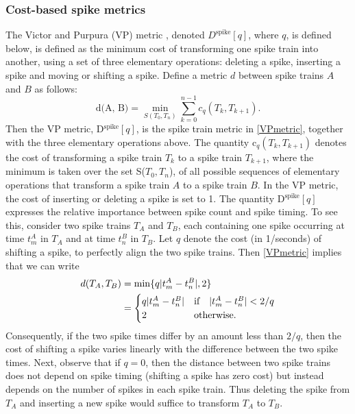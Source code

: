 \subsubsection{Cost-based spike metrics}
The Victor and Purpura (VP) metric \cite{Victor1996, Victor1998}, denoted
$D^{\text{spike}}[q]$, where $q$, is defined below, is defined as the minimum cost of transforming one spike train into another, using a set of three elementary operations:
deleting a spike, inserting a spike and moving or shifting a spike. Define a metric $d$ between spike trains $A$ and $B$ as follows:
\begin{equation}\label{VPmetric}
\text{d(A, B)} = \displaystyle \min_{S(T_{0}, T_{n})} \sum_{k=0}^{n-1} c_{q}(T_{k}, T_{k+1}). 
\end{equation} 
Then the VP metric, D$^{\text{spike}}[q]$, is the spike train metric in \eqref{VPmetric}, together with the three elementary operations above.
The quantity c$_{q}(T_{k}, T_{k+1})$ denotes the cost of transforming a spike train $T_{k}$ to a spike train $T_{k+1}$, where the minimum is taken over the set S($T_{0}, T_{n}$), of all possible sequences of elementary operations that transform a spike train $A$ to a spike train $B$.
In the VP metric, the cost of inserting or deleting a spike is set to 1.
The quantity D$^{\text{spike}}[q]$ expresses the relative importance between
spike count and spike timing.
To see this, consider two spike trains $T_{A}$ and $T_{B}$, each containing 
one spike occurring at time $t_{m}^{A}$ in $T_{A}$ and at time $t_{n}^{B}$ in $T_{B}$. Let $q$ denote the cost (in 1/seconds) of shifting a spike, to perfectly align the two spike trains.
Then \eqref{VPmetric} implies that we can write 
\begin{align*}
d(T_{A}, T_{B}) &= \displaystyle \min \{ q\lvert t_{m}^{A} - t_{n}^{B}\rvert,  2 \}\\
  &= \begin{cases} 
       q\lvert t_{m}^{A} - t_{n}^{B}\rvert & \text{if} \quad  \lvert t_{m}^{A} - t_{n}^{B}\rvert < 2/q \\
2 & \text{otherwise}.        
\end{cases}
\end{align*}
Consequently, if the two spike times differ by an amount less than $2/q$, then the cost of shifting a spike varies linearly with the difference between the two spike times.
Next, observe that if $q=0$, then the distance between two spike trains does not depend on spike timing (shifting a spike has zero cost) but instead depends on the number of spikes in each spike train. Thus deleting the spike from $T_{A}$ and inserting a new spike would suffice to transform $T_{A}$ to $T_{B}$.
